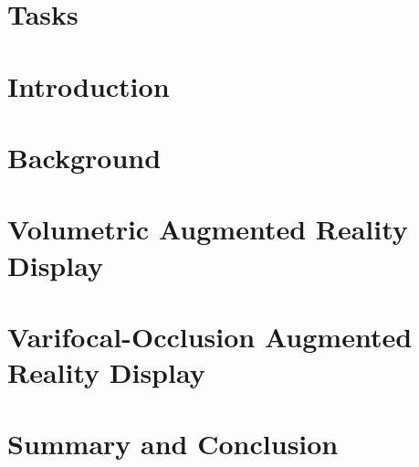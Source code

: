 





\chapter{Tasks}


\chapter{Introduction}
\label{introduction}


\chapter{Background}
\label{background}


\chapter{Volumetric Augmented Reality Display}
\label{volumetric_ned}


\chapter{Varifocal-Occlusion Augmented Reality Display}
\label{varifocal_occlusion_ned}


\chapter{Summary and Conclusion}
\label{conclusion}





